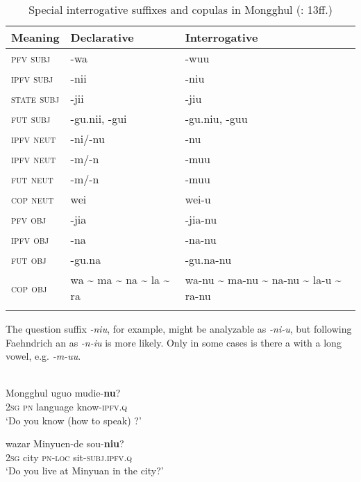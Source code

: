 \begin{table}
\caption{Special interrogative suffixes and copulas in Mongghul (\citealt{Åkerman2012}: 13ff.)}
\label{tab:mong:8}

\begin{tabularx}{\textwidth}{XXl}
\lsptoprule

\textbf{Meaning} & \textbf{Declarative} & \textbf{Interrogative}\\
\midrule
\textsc{pfv} \textsc{subj} & -wa & -wuu\\
\textsc{ipfv} \textsc{subj} & -nii & -niu\\
\textsc{state} \textsc{subj} & -jii & -jiu\\
\textsc{fut} \textsc{subj} & -gu.nii, -gui & -gu.niu, -guu\\
\textsc{ipfv} \textsc{neut} & -ni/-nu & -nu\\
\textsc{ipfv} \textsc{neut} & -m/-n & -muu\\
\textsc{fut} \textsc{neut} & -m/-n & -muu\\
\textsc{cop} \textsc{neut} & wei & wei-u\\
\textsc{pfv} \textsc{obj} & -jia & -jia-nu\\
\textsc{ipfv} \textsc{obj} & -na & -na-nu\\
\textsc{fut} \textsc{obj} & -gu.na & -gu.na-nu\\
\textsc{cop} \textsc{obj} & wa {\textasciitilde} ma {\textasciitilde} na {\textasciitilde} la {\textasciitilde} ra & wa-nu {\textasciitilde} ma-nu {\textasciitilde} na-nu {\textasciitilde} la-u {\textasciitilde} ra-nu\\
\lspbottomrule
\end{tabularx}
\end{table}

The question suffix \textit{-niu}, for example, might be analyzable as \textit{-ni-u}, but following Faehndrich an  as \textit{-n-iu} is more likely. Only in some cases is there a  with a long vowel, e.g. \textit{-m-uu}.

\ea%
    \label{ex:mong:55}
    \\
    \ea
     {Mongghul} {uguo} {mudie-}\textbf{{nu}}?\\
    2\textsc{sg}  \textsc{pn}    language  know-\textsc{ipfv}.\textsc{q}\\
    \glt ‘Do you know (how to speak) ?’
    
    \ex
     {wazar} {Minyuen-de} {sou-}\textbf{{niu}}?\\
    2\textsc{sg}   city  \textsc{pn}-\textsc{loc}    sit-\textsc{subj}.\textsc{ipfv}.\textsc{q}\\
    \glt ‘Do you live at Minyuan in the city?’
    
